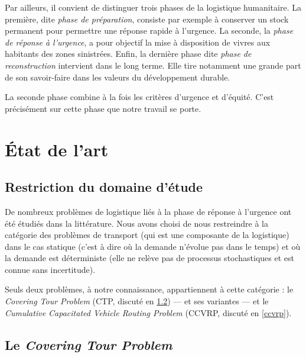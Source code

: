 \documentclass[5p,authoryear]{elsarticle}
\begin{document}
Par ailleurs, il convient de distinguer trois phases de la logistique humanitaire. La première, dite \emph{phase de préparation}, consiste par exemple à conserver un stock permanent pour permettre une réponse rapide à l’urgence. La seconde, la \emph{phase de réponse à l'urgence}, a pour objectif  la mise à disposition de vivres aux habitants des zones sinistrées. Enfin, la dernière phase dite  \emph{phase de reconstruction} intervient dans le long terme. Elle tire notamment une grande part de son savoir-faire dans les valeurs du développement durable.

La seconde phase combine à la fois les critères d'urgence et d'équité. C'est précisément sur cette phase que notre travail se porte.

%
%

\section{État de l'art} \label{etat_art}
\subsection{Restriction du domaine d'étude}
De nombreux problèmes de logistique liés à la phase de réponse à l'urgence ont été étudiés dans la littérature. Nous avons choisi de nous restreindre à la catégorie des problèmes de transport (qui est une composante de la logistique) dans le cas statique (c'est à dire où la demande n'évolue pas dans le temps) et où la demande est déterministe (elle ne relève pas de processus stochastiques et est connue sans incertitude).

Seuls deux problèmes, à notre connaissance, appartiennent à cette catégorie : le \emph{Covering Tour Problem} (CTP, discuté en \cref{ctp}) — et ses variantes — et le \emph{Cumulative Capacitated Vehicle Routing Problem} (CCVRP, discuté en \cref{ccvrp}).


\subsection{Le \emph{Covering Tour Problem}} \label{ctp}
\end{document}
